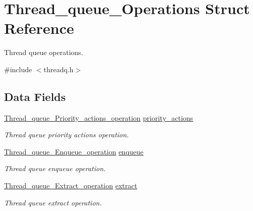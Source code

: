 \hypertarget{structThread__queue__Operations}{}\section{Thread\+\_\+queue\+\_\+\+Operations Struct Reference}
\label{structThread__queue__Operations}


Thread queue operations.  




{\ttfamily \#include $<$threadq.\+h$>$}

\subsection*{Data Fields}
\begin{DoxyCompactItemize}
\item 
\mbox{\label{structThread__queue__Operations_af84afc66c37c715570faebd16b6739d5}} 
\mbox{\hyperlink{group__RTEMSScoreThreadQueue_gacdacb1750c6bbc43f99e9c60bd1beba9}{Thread\+\_\+queue\+\_\+\+Priority\+\_\+actions\+\_\+operation}} \mbox{\hyperlink{structThread__queue__Operations_af84afc66c37c715570faebd16b6739d5}{priority\+\_\+actions}}
\begin{DoxyCompactList}\small\item\em Thread queue priority actions operation. \end{DoxyCompactList}\item 
\mbox{\hyperlink{group__RTEMSScoreThreadQueue_ga1d111ef0f5c9457f7e17a217fc7558cd}{Thread\+\_\+queue\+\_\+\+Enqueue\+\_\+operation}} \mbox{\hyperlink{structThread__queue__Operations_af30c12fd453a4d80b242dec356d5e331}{enqueue}}
\begin{DoxyCompactList}\small\item\em Thread queue enqueue operation. \end{DoxyCompactList}\item 
\mbox{\hyperlink{group__RTEMSScoreThreadQueue_ga7fdee2ebb4fe9f9dae612be0ecce85db}{Thread\+\_\+queue\+\_\+\+Extract\+\_\+operation}} \mbox{\hyperlink{structThread__queue__Operations_aca951f26ce2d2d3be6f62c3c882c1541}{extract}}
\begin{DoxyCompactList}\small\item\em Thread queue extract operation. \end{DoxyCompactList}\item 
\mbox{\label{structThread__queue__Operations_a13d0ee337419bccd8e33dc5800c33f42}} 

\end{DoxyCompactItemize}
